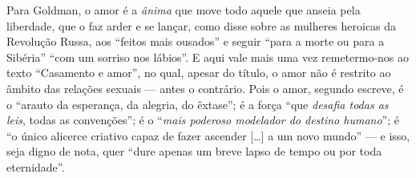 Para Goldman, o amor é a \emph{ânima} que
move todo aquele que anseia pela liberdade, que o faz arder e se lançar,
como disse sobre as mulheres heroicas da Revolução Russa, aos ``feitos
mais ousados'' ​​e seguir ``para a morte ou para a Sibéria'' ``com um
sorriso nos lábios''. E aqui vale mais uma vez remetermo-nos ao texto
``Casamento e amor'', no qual, apesar do título, o amor não é
restrito ao âmbito das relações sexuais --- antes o contrário. Pois o
amor, segundo escreve, é o ``arauto da esperança, da alegria, do
êxtase''; é a força ``que \emph{desafia todas as leis}, todas as
convenções''; é o ``\emph{mais poderoso modelador do destino humano}'';
é ``o único alicerce criativo capaz de fazer ascender {[}\ldots{]} a um
novo mundo'' --- e isso, seja digno de nota, quer ``dure apenas um breve
lapso de tempo ou por toda eternidade''. 

